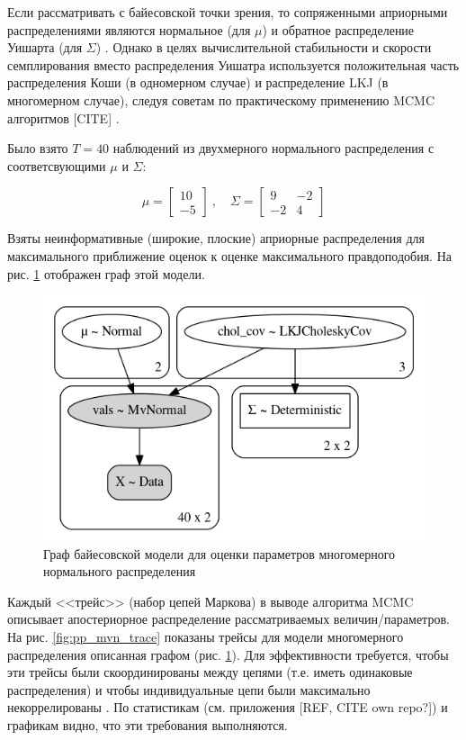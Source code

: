 \documentclass[a4paper,14pt]{extreport}
\begin{document}
Если рассматривать с байесовской точки зрения, то сопряженными априорными распределениями являются нормальное (для $\mu$) и обратное распределение Уишарта (для $\Sigma$) \cite{stan_user_guide}. Однако в целях вычислительной стабильности и скорости семплирования вместо распределения Уишатра используется положительная часть распределения Коши (в одномерном случае) и распределение LKJ (в многомерном случае), следуя советам по практическому применению MCMC алгоритмов [CITE] \cite{stan_user_guide}.

Было взято $T=40$ наблюдений из двухмерного нормального распределения с соответсвующими $\mu$ и $\Sigma$:

\begin{equation}
	\mu = 
	\begin{bmatrix}
		10 \\
		-5
	\end{bmatrix}
	\	, \quad
	\Sigma = 
	\begin{bmatrix} 
		9  & -2 \\
		-2 & 4 
	\end{bmatrix}
\end{equation}

Взяты неинформативные (широкие, плоские) априорные распределения для максимального приближение оценок к оценке максимального правдоподобия. На рис. \ref{fig:pp_mvn_graph} отображен граф этой модели.

\begin{figure}[H]
	\includegraphics[width=\linewidth]{img/gen/pp_mvn_graph.png}
	\caption{Граф байесовской модели для оценки параметров многомерного нормального распределения}
	\label{fig:pp_mvn_graph}
\end{figure}

Каждый <<трейс>> (набор цепей Маркова) в выводе алгоритма MCMC описывает апостериорное распределение рассматриваемых величин/параметров. На рис. \ref{fig:pp_mvn_trace} показаны трейсы для модели многомерного распределения описанная графом (рис. \ref{fig:pp_mvn_graph}). Для эффективности требуется, чтобы эти трейсы были скоординированы между цепями (т.е. иметь одинаковые распределения) и чтобы индивидуальные цепи были максимально некоррелированы \cite{stan_user_guide}. По статистикам (см. приложения [REF, CITE own repo?]) и графикам видно, что эти требования выполняются.
\end{document}

